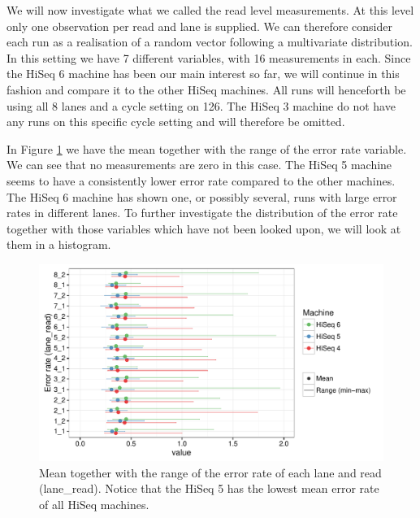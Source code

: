 \documentclass[a4paper,11pt,fleqn,twoside,notitlepage]{report}\usepackage[]{graphicx}\usepackage[]{color}
\makeatletter
\def\maxwidth{ %
  \ifdim\Gin@nat@width>\linewidth
    \linewidth
  \else
    \Gin@nat@width
  \fi
}
\newenvironment{knitrout}{}{} %
\makeatother
\begin{document}
We will now investigate what we called the read level measurements. At this level only one observation per read and lane is supplied. We can therefore consider each run as a realisation of a random vector following a multivariate distribution. In this setting we have 7 different variables, with 16 measurements in each. Since the HiSeq 6 machine has been our main interest so far, we will continue in this fashion and compare it to the other HiSeq machines. All runs will henceforth be using all 8 lanes and a cycle setting on 126. The HiSeq 3 machine do not have any runs on this specific cycle setting and will therefore be omitted.

In Figure \ref{fig:MeanVectorFigure} we have the mean together with the range of the error rate variable. We can see that no measurements are zero in this case. The HiSeq 5 machine seems to have a consistently lower error rate compared to the other machines. The HiSeq 6 machine has shown one, or possibly several, runs with large error rates in different lanes. To further investigate the distribution of the error rate together with those variables which have not been looked upon, we will look at them in a histogram.  
\begin{knitrout}
\color{fgcolor}\begin{figure}[!htb]
\includegraphics[width=\maxwidth]{figure/MeanVectorFigure-1} \caption[Mean together with the range of the error rate of each lane and read (lane\_read)]{Mean together with the range of the error rate of each lane and read (lane\_read). Notice that the HiSeq 5 has the lowest mean error rate of all HiSeq machines.}\label{fig:MeanVectorFigure}
\end{figure}


\end{knitrout}
\end{document}
